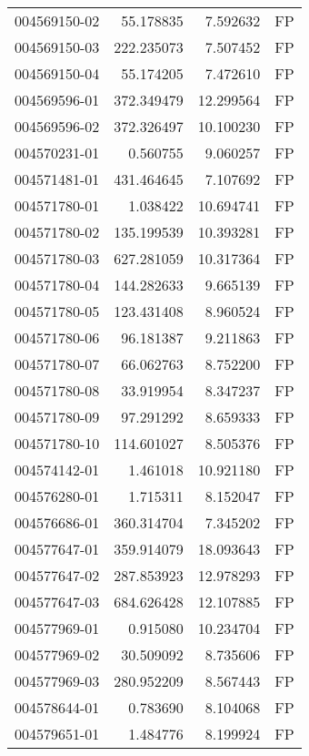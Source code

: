 \begin{tabular}{lrrl}
004569150-02 &   55.178835 &       7.592632 &   FP \\
004569150-03 &  222.235073 &       7.507452 &   FP \\
004569150-04 &   55.174205 &       7.472610 &   FP \\
004569596-01 &  372.349479 &      12.299564 &   FP \\
004569596-02 &  372.326497 &      10.100230 &   FP \\
004570231-01 &    0.560755 &       9.060257 &   FP \\
004571481-01 &  431.464645 &       7.107692 &   FP \\
004571780-01 &    1.038422 &      10.694741 &   FP \\
004571780-02 &  135.199539 &      10.393281 &   FP \\
004571780-03 &  627.281059 &      10.317364 &   FP \\
004571780-04 &  144.282633 &       9.665139 &   FP \\
004571780-05 &  123.431408 &       8.960524 &   FP \\
004571780-06 &   96.181387 &       9.211863 &   FP \\
004571780-07 &   66.062763 &       8.752200 &   FP \\
004571780-08 &   33.919954 &       8.347237 &   FP \\
004571780-09 &   97.291292 &       8.659333 &   FP \\
004571780-10 &  114.601027 &       8.505376 &   FP \\
004574142-01 &    1.461018 &      10.921180 &   FP \\
004576280-01 &    1.715311 &       8.152047 &   FP \\
004576686-01 &  360.314704 &       7.345202 &   FP \\
004577647-01 &  359.914079 &      18.093643 &   FP \\
004577647-02 &  287.853923 &      12.978293 &   FP \\
004577647-03 &  684.626428 &      12.107885 &   FP \\
004577969-01 &    0.915080 &      10.234704 &   FP \\
004577969-02 &   30.509092 &       8.735606 &   FP \\
004577969-03 &  280.952209 &       8.567443 &   FP \\
004578644-01 &    0.783690 &       8.104068 &   FP \\
004579651-01 &    1.484776 &       8.199924 &   FP \\

\end{tabular}
